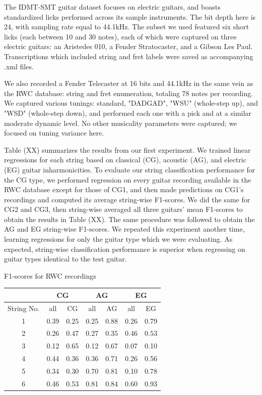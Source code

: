 \documentclass[12pt]{cmuthesis}
\begin{document}
The IDMT-SMT guitar dataset focuses on electric guitars, and boasts standardized licks performed across its sample instruments. The bit depth here is 24, with sampling rate equal to 44.1kHz. The subset we used featured six short licks (each between 10 and 30 notes), each of which were captured on three electric guitars: an Aristedes 010, a Fender Stratocaster, and a Gibson Les Paul. Transcriptions which included string and fret labels were saved as accompanying .xml files.

We also recorded a Fender Telecaster at 16 bits and 44.1kHz in the same vein as the RWC database: string and fret enumeration, totaling 78 notes per recording. We captured various tunings: standard, "DADGAD", "WSU" (whole-step up), and "WSD" (whole-step down), and performed each one with a pick and at a similar moderate dynamic level. No other musicality parameters were captured; we focused on tuning variance here.

Table (XX) summarizes the results from our first experiment. We trained linear regressions for each string based on classical (CG), acoustic (AG), and electric (EG) guitar inharmonicities. To evaluate our string classification performance for the CG type, we performed regression on every guitar recording available in the RWC database except for those of CG1, and then made predictions on CG1's recordings and computed its average string-wise F1-scores. We did the same for CG2 and CG3, then string-wise averaged all three guitars' mean F1-scores to obtain the results in Table (XX). The same procedure was followed to obtain the AG and EG string-wise F1-scores. We repeated this experiment another time, learning regressions for only the guitar type which we were evaluating. As expected, string-wise classification performance is superior when regressing on guitar types identical to the test guitar.

F1-scores for RWC recordings
\begin{center}
\begin{tabular} {||c||c|c||c|c||c|c||}
\hline
 & \multicolumn{2}{|c|}{CG} & \multicolumn{2}{|c|}{AG} & \multicolumn{2}{|c|}{EG}\\
\hline
String No. & all & CG & all & AG & all & EG \\
\hline
\hline
1 & 0.39 & $0.25$ & 0.25 & $0.88$ & 0.26 & $0.79$ \\
\hline
2 & 0.26 & $0.47$ & 0.27 & $0.35$ & 0.46 & $0.53$ \\
\hline
3 & 0.12 & 0.65 &  0.12 & 0.67 & 0.07 & 0.10\\
\hline
4 & 0.44 & 0.36 & 0.36 & 0.71 & 0.26 & 0.56\\
\hline
5 & 0.34 & 0.30 & 0.70 & 0.81 & 0.10 & 0.78 \\
\hline
6 & 0.46 & 0.53 & 0.81 & 0.84 & 0.60 & 0.93\\
\hline
\end{tabular}
\end{center}
\end{document}
